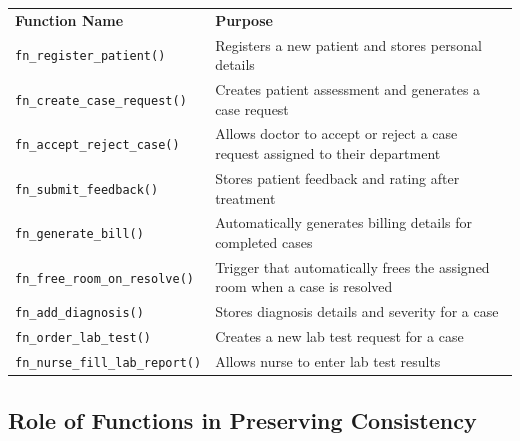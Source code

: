 \documentclass{article}
\newcommand{\theadcell}{\color{white}\bfseries}
\begin{document}
\begin{center}
\renewcommand{\arraystretch}{1.5}
\begin{tabular}{L{5cm} L{8cm}}
 \theadcell Function Name & \theadcell Purpose \\

 \texttt{fn\_register\_patient()} &
Registers a new patient and stores personal details \\

 \texttt{fn\_create\_case\_request()} &
Creates patient assessment and generates a case request \\

 \texttt{fn\_accept\_reject\_case()} &
Allows doctor to accept or reject a case request assigned to their department \\

 \texttt{fn\_submit\_feedback()} &
Stores patient feedback and rating after treatment \\

 \texttt{fn\_generate\_bill()} &
Automatically generates billing details for completed cases \\

 \texttt{fn\_free\_room\_on\_resolve()} &
Trigger that automatically frees the assigned room when a case is resolved \\

 \texttt{fn\_add\_diagnosis()} &
Stores diagnosis details and severity for a case \\

 \texttt{fn\_order\_lab\_test()} &
Creates a new lab test request for a case \\

 \texttt{fn\_nurse\_fill\_lab\_report()} &
Allows nurse to enter lab test results \\

\end{tabular}
\end{center}

\subsection{Role of Functions in Preserving Consistency}
\end{document}
